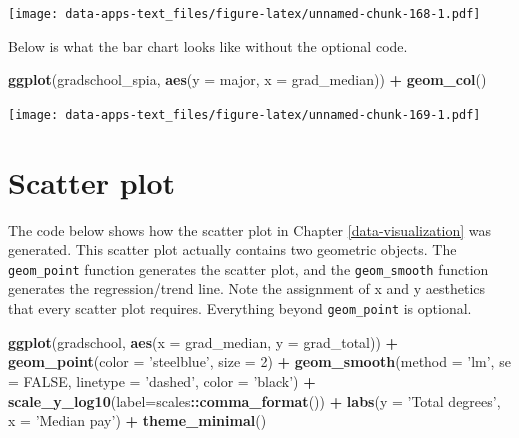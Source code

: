 \documentclass[
]{book}
\newenvironment{Shaded}{\begin{snugshade}}{\end{snugshade}}
\newcommand{\DataTypeTok}[1]{\textcolor[rgb]{0.13,0.29,0.53}{#1}}
\newcommand{\DecValTok}[1]{\textcolor[rgb]{0.00,0.00,0.81}{#1}}
\newcommand{\KeywordTok}[1]{\textcolor[rgb]{0.13,0.29,0.53}{\textbf{#1}}}
\newcommand{\NormalTok}[1]{#1}
\newcommand{\OperatorTok}[1]{\textcolor[rgb]{0.81,0.36,0.00}{\textbf{#1}}}
\newcommand{\OtherTok}[1]{\textcolor[rgb]{0.56,0.35,0.01}{#1}}
\newcommand{\StringTok}[1]{\textcolor[rgb]{0.31,0.60,0.02}{#1}}
\begin{document}
\texttt{[image: data-apps-text\_files/figure-latex/unnamed-chunk-168-1.pdf]}

Below is what the bar chart looks like without the optional code.

\begin{Shaded}
\begin{Highlighting}[]
\KeywordTok{ggplot}\NormalTok{(gradschool_spia, }\KeywordTok{aes}\NormalTok{(}\DataTypeTok{y =}\NormalTok{ major, }\DataTypeTok{x =}\NormalTok{ grad_median)) }\OperatorTok{+}
\StringTok{  }\KeywordTok{geom_col}\NormalTok{()}
\end{Highlighting}
\end{Shaded}

\texttt{[image: data-apps-text\_files/figure-latex/unnamed-chunk-169-1.pdf]}

\hypertarget{scatter-plot}{%
\section{Scatter plot}\label{scatter-plot}}

The code below shows how the scatter plot in Chapter \ref{data-visualization} was generated. This scatter plot actually contains two geometric objects. The \texttt{geom\_point} function generates the scatter plot, and the \texttt{geom\_smooth} function generates the regression/trend line. Note the assignment of x and y aesthetics that every scatter plot requires. Everything beyond \texttt{geom\_point} is optional.

\begin{Shaded}
\begin{Highlighting}[]
\KeywordTok{ggplot}\NormalTok{(gradschool, }\KeywordTok{aes}\NormalTok{(}\DataTypeTok{x =}\NormalTok{ grad_median, }\DataTypeTok{y =}\NormalTok{ grad_total)) }\OperatorTok{+}
\StringTok{  }\KeywordTok{geom_point}\NormalTok{(}\DataTypeTok{color =} \StringTok{'steelblue'}\NormalTok{, }\DataTypeTok{size =} \DecValTok{2}\NormalTok{) }\OperatorTok{+}
\StringTok{  }\KeywordTok{geom_smooth}\NormalTok{(}\DataTypeTok{method =} \StringTok{'lm'}\NormalTok{, }\DataTypeTok{se =} \OtherTok{FALSE}\NormalTok{, }
              \DataTypeTok{linetype =} \StringTok{'dashed'}\NormalTok{, }\DataTypeTok{color =} \StringTok{'black'}\NormalTok{) }\OperatorTok{+}
\StringTok{  }\KeywordTok{scale_y_log10}\NormalTok{(}\DataTypeTok{label=}\NormalTok{scales}\OperatorTok{::}\KeywordTok{comma_format}\NormalTok{()) }\OperatorTok{+}
\StringTok{  }\KeywordTok{labs}\NormalTok{(}\DataTypeTok{y =} \StringTok{'Total degrees'}\NormalTok{,}
       \DataTypeTok{x =} \StringTok{'Median pay'}\NormalTok{) }\OperatorTok{+}
\StringTok{  }\KeywordTok{theme_minimal}\NormalTok{()}
\end{Highlighting}
\end{Shaded}
\end{document}
